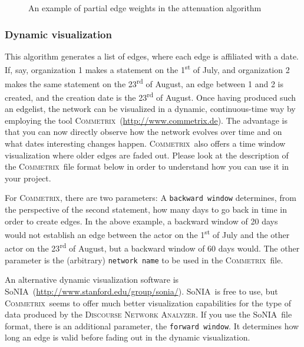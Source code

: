 \documentclass[12pt,a4paper]{scrreprt}
\newcommand{\dnalong}{\textsc{Discourse} \textsc{Network} \textsc{Analyzer}}
\newcommand{\commetrix}{\textsc{Commetrix}}
\newcommand{\sonia}{SoNIA}
\newcommand{\code}[1]{\texttt{#1}}
\begin{document}
\begin{figure}
\caption{An example of partial edge weights in the attenuation algorithm}
\label{atten}
\end{figure}

\subsubsection{Dynamic visualization}
This algorithm generates a list of edges, where each edge is affiliated with a date. If, say, organization 1 makes a statement on the 1\textsuperscript{st} of July, and organization 2 makes the same statement on the 23\textsuperscript{rd} of August, an edge between 1 and 2 is created, and the creation date is the 23\textsuperscript{rd} of August. Once having produced such an edgelist, the network can be visualized in a dynamic, continuous-time way by employing the tool \commetrix\ (\url{http://www.commetrix.de}). The advantage is that you can now directly observe how the network evolves over time and on what dates interesting changes happen. \commetrix\ also offers a time window visualization where older edges are faded out. Please look at the description of the \commetrix\ file format below in order to understand how you can use it in your project. \par For \commetrix, there are two parameters: A \code{backward window} determines, from the perspective of the second statement, how many days to go back in time in order to create edges. In the above example, a backward window of 20 days would not establish an edge between the actor on the 1\textsuperscript{st} of July and the other actor on the 23\textsuperscript{rd} of August, but a backward window of 60 days would. The other parameter is the (arbitrary) \code{network name} to be used in the \commetrix\ file. \par An alternative dynamic visualization software is \sonia\ (\url{http://www.stanford.edu/group/sonia/}). \sonia\ is free to use, but \commetrix\ seems to offer much better visualization capabilities for the type of data produced by the \dnalong.  If you use the \sonia\ file format, there is an additional parameter, the \code{forward window}. It determines how long an edge is valid before fading out in the dynamic visualization.
\end{document}
